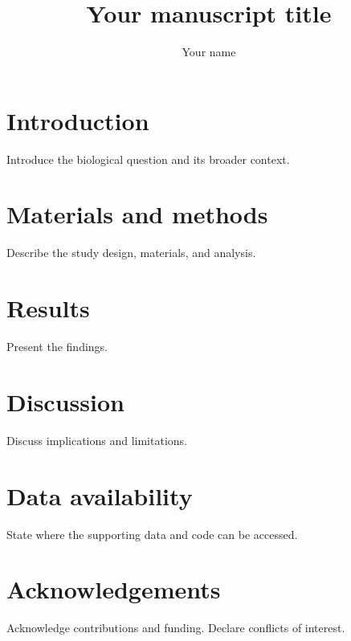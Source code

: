 \documentclass[unnumsec,webpdf,contemporary,large,namedate]{oup-authoring-template}
\begin{document}
\title[Short title]{Your manuscript title}
\author[1]{Your name}
\address[1]{, , }
\maketitle
\section{Introduction}
Introduce the biological question and its broader context.
\section{Materials and methods}
Describe the study design, materials, and analysis.
\section{Results}
Present the findings.
\section{Discussion}
Discuss implications and limitations.
\section{Data availability}
State where the supporting data and code can be accessed.
\section{Acknowledgements}
Acknowledge contributions and funding. Declare conflicts of interest.
% 
% 
\end{document}
